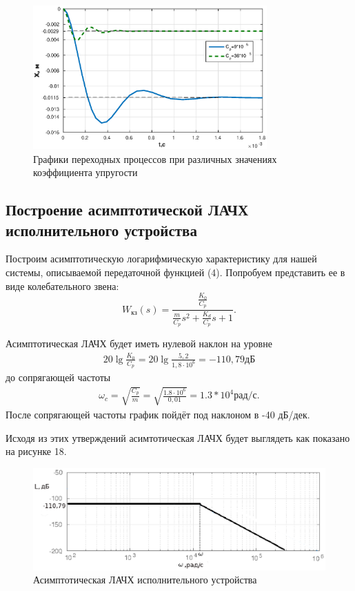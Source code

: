 \documentclass[12pt, a4paper]{article}
\begin{document}
\begin{figure}[H]
\centering
\includegraphics[width =0.8\textwidth]{1/X4.eps}
\caption{Графики переходных процессов при различных значениях коэффициента упругости}
\end{figure}
 
\newpage
\begin{center}
\section{Построение асимптотической ЛАЧХ  исполнительного устройства} 
\end{center}
 \par
 Построим асимптотическую логарифмическую характеристику для нашей системы, описываемой передаточной функцией (4). Попробуем
 представить ее в виде колебательного звена:
	\begin{equation}
	 W_\text{кз}(s) = \frac{\displaystyle{\frac{K_0}{C_p}}}{\displaystyle{\frac{m}{C_p}}s^2 + \frac{K_d}{C_p}s + 1}.
	\end{equation}
	
	Асимптотическая ЛАЧХ будет иметь нулевой наклон на уровне 
	\begin{align}
	20\lg \displaystyle{\frac{K_0}{C_p}} = 20\lg \displaystyle{\frac{5,2}{1,8\cdot10^6}} = -110,79 \text{дБ}
	\end{align}
	до сопрягающей частоты 
	\begin{align}
	\omega_c = \sqrt{\displaystyle{\frac{C_p}{m}}} = \sqrt{\displaystyle{\frac{1.8\cdot10^6}{0,01}}} = 1.3*10^4 \text{рад/с}.
	\end{align}
	После сопрягающей частоты график пойдёт под наклоном в -40 дБ/дек. 
	\par Исходя из этих утверждений асимтотическая ЛАЧХ будет выглядеть как показано на рисунке 18.
	\begin{figure}[H]
	\centering
	\includegraphics[width =0.8 \textwidth]{1/afchx.eps}
	\caption{Асимптотическая ЛАЧХ исполнительного устройства}
	\end{figure}
 
\end{document}
